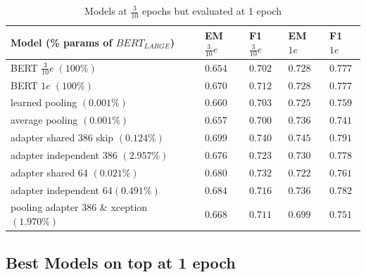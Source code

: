 \begin{table}[ht]
	\centering
	\small
	\begin{tabular}{L{3.5cm} C{0.6cm} C{0.6cm} C{0.6cm} C{0.6cm}}
		\hline
		\textbf{Model} (\% params of $BERT_{LARGE}$)       & \textbf{EM $\frac{3}{10}e$} & \textbf{F1 $\frac{3}{10}e$} & \textbf{EM $1e$} & \textbf{F1 $1e$}\Tstrut \\
		\hline
		BERT $\frac{3}{10}e\;\left(100\%\right)$           & $0.654$ & $0.702$ & $0.728$ & $0.777$\Tstrut\Bstrut  \\
		BERT $1e\;\left(100\%\right)$ 					   & $0.670$ & $0.712$ & $0.728$ & $0.777$\Tstrut\Bstrut  \\
		learned pooling $\left(0.001\%\right)$             & $0.660$ & $0.703$ & $0.725$ & $0.759$\Tstrut\Bstrut  \\
		average pooling $\left(0.001\%\right)$             & $0.657$ & $0.700$ & $0.736$ & $0.741$\Tstrut\Bstrut  \\
		\hline\hline
		adapter shared 386 skip $\left(0.124\%\right)$     & \boldmath$0.699$ & \boldmath$0.740$ & \boldmath$0.745$ & \boldmath$0.791$\Tstrut\Bstrut  \\
		\hline\hline
		adapter independent 386 $\left(2.957\%\right)$     & $0.676$ & $0.723$ & $0.730$ & $0.778$\Tstrut\Bstrut  \\
		adapter shared 64 $\left(0.021\%\right)$           & $0.680$ & $0.732$ & $0.722$ & $0.761$\Tstrut\Bstrut  \\
		adapter independent 64$\left(0.491\%\right)$         & $0.684$ & $0.716$ & $0.736$ & $0.782$\Tstrut\Bstrut  \\
		pooling adapter 386 \& xception $\left(1.970\%\right)$         & $0.668$ & $0.711$ & $0.699$ & $0.751$\Tstrut\Bstrut  \\
		\hline
	\end{tabular}
	\caption{\label{tbl:3_10_Models}Models at $\frac{3}{10}$ epochs but evaluated at 1 epoch}
\end{table}

\subsection{Best Models on top at 1 epoch}

